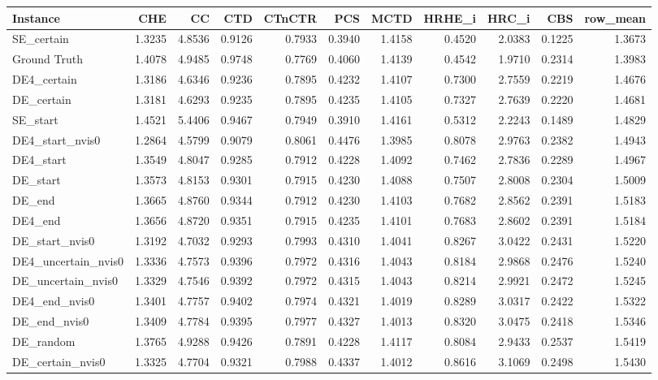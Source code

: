 \begin{tabular}{lrrrrrrrrrr}
\toprule
Instance & CHE & CC & CTD & CTnCTR & PCS & MCTD & HRHE_i & HRC_i & CBS & row_mean \\
\midrule
SE_certain & 1.3235 & 4.8536 & 0.9126 & 0.7933 & 0.3940 & 1.4158 & 0.4520 & 2.0383 & 0.1225 & 1.3673 \\
Ground Truth & 1.4078 & 4.9485 & 0.9748 & 0.7769 & 0.4060 & 1.4139 & 0.4542 & 1.9710 & 0.2314 & 1.3983 \\
DE4_certain & 1.3186 & 4.6346 & 0.9236 & 0.7895 & 0.4232 & 1.4107 & 0.7300 & 2.7559 & 0.2219 & 1.4676 \\
DE_certain & 1.3181 & 4.6293 & 0.9235 & 0.7895 & 0.4235 & 1.4105 & 0.7327 & 2.7639 & 0.2220 & 1.4681 \\
SE_start & 1.4521 & 5.4406 & 0.9467 & 0.7949 & 0.3910 & 1.4161 & 0.5312 & 2.2243 & 0.1489 & 1.4829 \\
DE4_start_nvis0 & 1.2864 & 4.5799 & 0.9079 & 0.8061 & 0.4476 & 1.3985 & 0.8078 & 2.9763 & 0.2382 & 1.4943 \\
DE4_start & 1.3549 & 4.8047 & 0.9285 & 0.7912 & 0.4228 & 1.4092 & 0.7462 & 2.7836 & 0.2289 & 1.4967 \\
DE_start & 1.3573 & 4.8153 & 0.9301 & 0.7915 & 0.4230 & 1.4088 & 0.7507 & 2.8008 & 0.2304 & 1.5009 \\
DE_end & 1.3665 & 4.8760 & 0.9344 & 0.7912 & 0.4230 & 1.4103 & 0.7682 & 2.8562 & 0.2391 & 1.5183 \\
DE4_end & 1.3656 & 4.8720 & 0.9351 & 0.7915 & 0.4235 & 1.4101 & 0.7683 & 2.8602 & 0.2391 & 1.5184 \\
DE_start_nvis0 & 1.3192 & 4.7032 & 0.9293 & 0.7993 & 0.4310 & 1.4041 & 0.8267 & 3.0422 & 0.2431 & 1.5220 \\
DE4_uncertain_nvis0 & 1.3336 & 4.7573 & 0.9396 & 0.7972 & 0.4316 & 1.4043 & 0.8184 & 2.9868 & 0.2476 & 1.5240 \\
DE_uncertain_nvis0 & 1.3329 & 4.7546 & 0.9392 & 0.7972 & 0.4315 & 1.4043 & 0.8214 & 2.9921 & 0.2472 & 1.5245 \\
DE4_end_nvis0 & 1.3401 & 4.7757 & 0.9402 & 0.7974 & 0.4321 & 1.4019 & 0.8289 & 3.0317 & 0.2422 & 1.5322 \\
DE_end_nvis0 & 1.3409 & 4.7784 & 0.9395 & 0.7977 & 0.4327 & 1.4013 & 0.8320 & 3.0475 & 0.2418 & 1.5346 \\
DE_random & 1.3765 & 4.9288 & 0.9426 & 0.7891 & 0.4228 & 1.4117 & 0.8084 & 2.9433 & 0.2537 & 1.5419 \\
DE_certain_nvis0 & 1.3325 & 4.7704 & 0.9321 & 0.7988 & 0.4337 & 1.4012 & 0.8616 & 3.1069 & 0.2498 & 1.5430 \\

\end{tabular}
